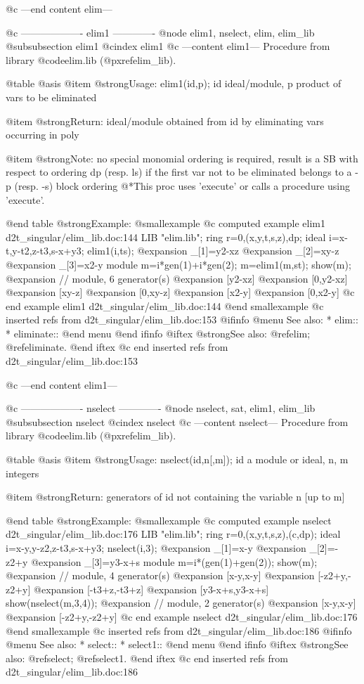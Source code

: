 @c ---end content elim---

@c ------------------- elim1 -------------
@node elim1, nselect, elim, elim_lib
@subsubsection elim1
@cindex elim1
@c ---content elim1---
Procedure from library @code{elim.lib} (@pxref{elim_lib}).

@table @asis
@item @strong{Usage:}
elim1(id,p); id ideal/module, p product of vars to be eliminated

@item @strong{Return:}
ideal/module obtained from id by eliminating vars occurring in poly

@item @strong{Note:}
no special monomial ordering is required, result is a SB with
respect to ordering dp (resp. ls) if the first var not to be
eliminated belongs to a -p (resp. -s) block ordering
@*This proc uses 'execute' or calls a procedure using 'execute'.

@end table
@strong{Example:}
@smallexample
@c computed example elim1 d2t_singular/elim_lib.doc:144 
LIB "elim.lib";
ring r=0,(x,y,t,s,z),dp;
ideal i=x-t,y-t2,z-t3,s-x+y3;
elim1(i,ts);
@expansion{} _[1]=y2-xz
@expansion{} _[2]=xy-z
@expansion{} _[3]=x2-y
module m=i*gen(1)+i*gen(2);
m=elim1(m,st); show(m);
@expansion{} // module, 6 generator(s)
@expansion{} [y2-xz]
@expansion{} [0,y2-xz]
@expansion{} [xy-z]
@expansion{} [0,xy-z]
@expansion{} [x2-y]
@expansion{} [0,x2-y]
@c end example elim1 d2t_singular/elim_lib.doc:144
@end smallexample
@c inserted refs from d2t_singular/elim_lib.doc:153
@ifinfo
@menu
See also:
* elim::
* eliminate::
@end menu
@end ifinfo
@iftex
@strong{See also:}
@ref{elim};
@ref{eliminate}.
@end iftex
@c end inserted refs from d2t_singular/elim_lib.doc:153

@c ---end content elim1---

@c ------------------- nselect -------------
@node nselect, sat, elim1, elim_lib
@subsubsection nselect
@cindex nselect
@c ---content nselect---
Procedure from library @code{elim.lib} (@pxref{elim_lib}).

@table @asis
@item @strong{Usage:}
nselect(id,n[,m]); id a module or ideal, n, m integers

@item @strong{Return:}
generators of id not containing the variable n [up to m]

@end table
@strong{Example:}
@smallexample
@c computed example nselect d2t_singular/elim_lib.doc:176 
LIB "elim.lib";
ring r=0,(x,y,t,s,z),(c,dp);
ideal i=x-y,y-z2,z-t3,s-x+y3;
nselect(i,3);
@expansion{} _[1]=x-y
@expansion{} _[2]=-z2+y
@expansion{} _[3]=y3-x+s
module m=i*(gen(1)+gen(2));
show(m);
@expansion{} // module, 4 generator(s)
@expansion{} [x-y,x-y]
@expansion{} [-z2+y,-z2+y]
@expansion{} [-t3+z,-t3+z]
@expansion{} [y3-x+s,y3-x+s]
show(nselect(m,3,4));
@expansion{} // module, 2 generator(s)
@expansion{} [x-y,x-y]
@expansion{} [-z2+y,-z2+y]
@c end example nselect d2t_singular/elim_lib.doc:176
@end smallexample
@c inserted refs from d2t_singular/elim_lib.doc:186
@ifinfo
@menu
See also:
* select::
* select1::
@end menu
@end ifinfo
@iftex
@strong{See also:}
@ref{select};
@ref{select1}.
@end iftex
@c end inserted refs from d2t_singular/elim_lib.doc:186

